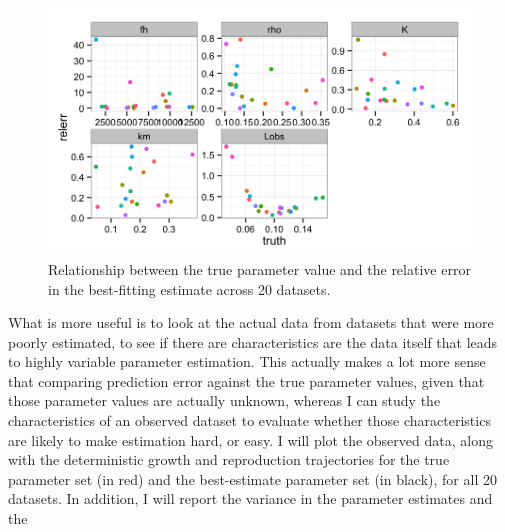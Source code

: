 \documentclass[12pt,reqno,final,pdftex]{amsart}\usepackage[]{graphicx}\usepackage[]{color}
\newenvironment{knitrout}{}{} %
\theoremstyle{plain}
\numberwithin{equation}{part}
\begin{document}
\begin{knitrout}\scriptsize
{}\color{fgcolor}\begin{figure}

\includegraphics[width=\linewidth]{figure/truth-est-corr-1} \hfill{}

\caption[Relationship between the true parameter value and the relative error in the best-fitting estimate across 20 datasets]{Relationship between the true parameter value and the relative error in the best-fitting estimate across 20 datasets.}\label{fig:truth-est-corr}
\end{figure}


\end{knitrout}
\clearpage

What is more useful is to look at the actual data from datasets that were more poorly estimated, to see if there are characteristics are the data itself that leads to highly variable parameter estimation.
This actually makes a lot more sense that comparing prediction error against the true parameter values, given that those parameter values are actually unknown, whereas I can study the characteristics of an observed dataset to evaluate whether those characteristics are likely to make estimation hard, or easy.
I will plot the observed data, along with the deterministic growth and reproduction trajectories for the true parameter set (in red) and the best-estimate parameter set (in black), for all 20 datasets.
In addition, I will report the variance in the parameter estimates and the
\end{document}
